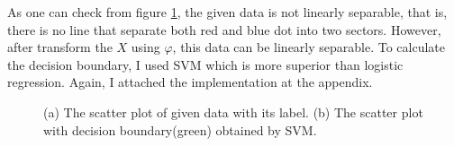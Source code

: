 \documentclass[10pt]{article}
\begin{document}
As one can check from figure \ref{fig3}, the given data is not linearly separable, that is, there is no line that separate both red and blue dot into two sectors.
However, after transform the $X$ using $\varphi$, this data can be linearly separable. To calculate the decision boundary, I used SVM which is more superior than logistic regression.
Again, I attached the implementation at the appendix. 
\begin{figure}[!h]
    \begin{center}
    \end{center}
    \caption{(a) The scatter plot of given data with its label. (b) The scatter plot with decision boundary(green) obtained by SVM.}
    \label{fig3}
\end{figure}
\end{document}
